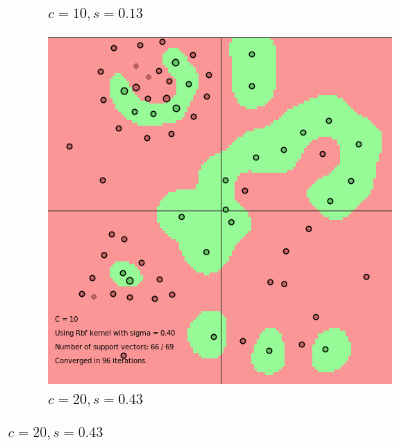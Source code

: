 \documentclass{article}
\begin{document}
\begin{figure}
\begin{subfigure}{0.3\textwidth}
   \caption{$c=10, s=0.13$} \label{fig:x_e}
\end{subfigure}
\hspace*{\fill}
\begin{subfigure}{0.3\textwidth}
   \includegraphics[width=\linewidth]{c=10_s=040}
   \caption{$c=20, s=0.43$} \label{fig:x_f}
\end{subfigure}


\end{figure}
\end{document}
